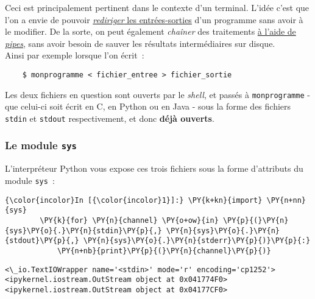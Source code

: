 Ceci est principalement pertinent dans le contexte d'un terminal. L'idée
c'est que l'on a envie de pouvoir
\href{http://en.wikipedia.org/wiki/Redirection_\%28computing\%29}{\emph{rediriger}
les entrées-sorties} d'un programme sans avoir à le modifier. De la
sorte, on peut également \emph{chaîner} des traitements
\href{http://en.wikipedia.org/wiki/Redirection_\%28computing\%29\#Piping}{à
l'aide de \emph{pipes}}, sans avoir besoin de sauver les résultats
intermédiaires sur disque.\\

    Ainsi par exemple lorsque l'on écrit~:

\begin{verbatim}
    $ monprogramme < fichier_entree > fichier_sortie
\end{verbatim}

Les deux fichiers en question sont ouverts par le \emph{shell}, et
passés à \texttt{monprogramme} - que celui-ci soit écrit en C, en Python
ou en Java - sous la forme des fichiers \texttt{stdin} et
\texttt{stdout} respectivement, et donc \textbf{déjà ouverts}.

    \hypertarget{le-module-sys}{%
\subsubsection{\texorpdfstring{Le module
\texttt{sys}}{Le module sys}}\label{le-module-sys}}

    L'interpréteur Python vous expose ces trois fichiers sous la forme
d'attributs du module \texttt{sys}~:

    \begin{Verbatim}[commandchars=\\\{\}]
{\color{incolor}In [{\color{incolor}1}]:} \PY{k+kn}{import} \PY{n+nn}{sys}
        \PY{k}{for} \PY{n}{channel} \PY{o+ow}{in} \PY{p}{(}\PY{n}{sys}\PY{o}{.}\PY{n}{stdin}\PY{p}{,} \PY{n}{sys}\PY{o}{.}\PY{n}{stdout}\PY{p}{,} \PY{n}{sys}\PY{o}{.}\PY{n}{stderr}\PY{p}{)}\PY{p}{:}
            \PY{n+nb}{print}\PY{p}{(}\PY{n}{channel}\PY{p}{)}
\end{Verbatim}


    \begin{Verbatim}[commandchars=\\\{\}]
<\_io.TextIOWrapper name='<stdin>' mode='r' encoding='cp1252'>
<ipykernel.iostream.OutStream object at 0x041774F0>
<ipykernel.iostream.OutStream object at 0x04177CF0>

    \end{Verbatim}

